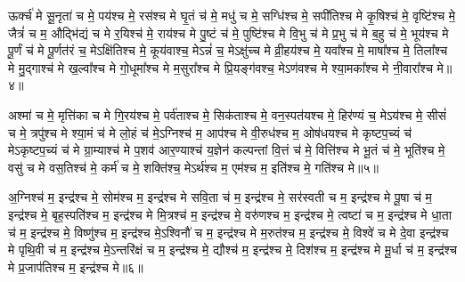 

ऊर्क्च॑ मे सू॒नृता॑ च मे॒ पय॑श्च मे॒ रस॑श्च मे घृ॒तं च॑ मे॒ मधु॑ च मे॒ सग्धि॑श्च मे॒ सपी॑तिश्च मे कृ॒षिश्च॑ मे॒ वृष्टि॑श्च मे॒ जैत्रं॑ च म॒ औद्भि॑द्यं च मे र॒यिश्च॑ मे॒ राय॑श्च मे पु॒ष्टं च॑ मे॒ पुष्टि॑श्च मे वि॒भु च॑ मे प्र॒भु च॑ मे ब॒हु च॑ मे॒ भूय॑श्च मे पू॒र्णं च॑ मे पू॒र्णत॑रं च॒ मेऽक्षि॑तिश्च मे॒ कूय॑वाश्च॒ मेऽन्नं॑ च॒ मेऽक्षु॑च्च मे व्री॒हय॑श्च मे॒ यवा᳚श्च मे॒ माषा᳚श्च मे॒ तिला᳚श्च मे मु॒द्गाश्च॑ मे ख॒ल्वा᳚श्च मे गो॒धूमा᳚श्च मे म॒सुरा᳚श्च मे प्रि॒यङ्ग॑वश्च॒ मेऽण॑वश्च मे श्या॒मका᳚श्च मे नी॒वारा᳚श्च मे॥४॥



अश्मा॑ च मे॒ मृत्ति॑का च मे गि॒रय॑श्च मे॒ पर्व॑ताश्च मे॒ सिक॑ताश्च मे॒ वन॒स्पत॑यश्च मे॒ हिर॑ण्यं च॒ मेऽय॑श्च मे॒ सीसं॑ च मे॒ त्रपु॑श्च मे श्या॒मं च॑ मे लो॒हं च॑ मे॒ऽग्निश्च॑ म॒ आप॑श्च मे वी॒रुध॑श्च म॒ ओष॑धयश्च मे कृष्टप॒च्यं च॑ मेऽकृष्टप॒च्यं च॑ मे ग्रा॒म्याश्च॑ मे प॒शव॑ आर॒ण्याश्च॑ य॒ज्ञेन॑ कल्पन्तां वि॒त्तं च॑ मे॒ वित्ति॑श्च मे भू॒तं च॑ मे॒ भूति॑श्च मे॒ वसु॑ च मे वस॒तिश्च॑ मे॒ कर्म॑ च मे॒ शक्ति॑श्च॒ मेऽर्थ॑श्च म॒ एम॑श्च म॒ इति॑श्च मे॒ गति॑श्च मे॥५॥



अ॒ग्निश्च॑ म॒ इन्द्र॑श्च मे॒ सोम॑श्च म॒ इन्द्र॑श्च मे सवि॒ता च॑ म॒ इन्द्र॑श्च मे॒ सर॑स्वती च म॒ इन्द्र॑श्च मे पू॒षा च॑ म॒ इन्द्र॑श्च मे॒ बृह॒स्पति॑श्च म॒ इन्द्र॑श्च मे मि॒त्रश्च॑ म॒ इन्द्र॑श्च मे॒ वरु॑णश्च म॒ इन्द्र॑श्च मे॒ त्वष्टा॑ च म॒ इन्द्र॑श्च मे धा॒ता च॑ म॒ इन्द्र॑श्च मे॒ विष्णु॑श्च म॒ इन्द्र॑श्च मे॒ऽश्विनौ॑ च म॒ इन्द्र॑श्च मे म॒रुत॑श्च म॒ इन्द्र॑श्च मे॒ विश्वे॑ च मे दे॒वा इन्द्र॑श्च मे पृथि॒वी च॑ म॒ इन्द्र॑श्च मे॒ऽन्तरि॑क्षं च म॒ इन्द्र॑श्च मे॒ द्यौश्च॑ म॒ इन्द्र॑श्च मे॒ दिश॑श्च म॒ इन्द्र॑श्च मे मू॒र्धा च॑ म॒ इन्द्र॑श्च मे प्र॒जाप॑तिश्च म॒ इन्द्र॑श्च मे॥६॥

